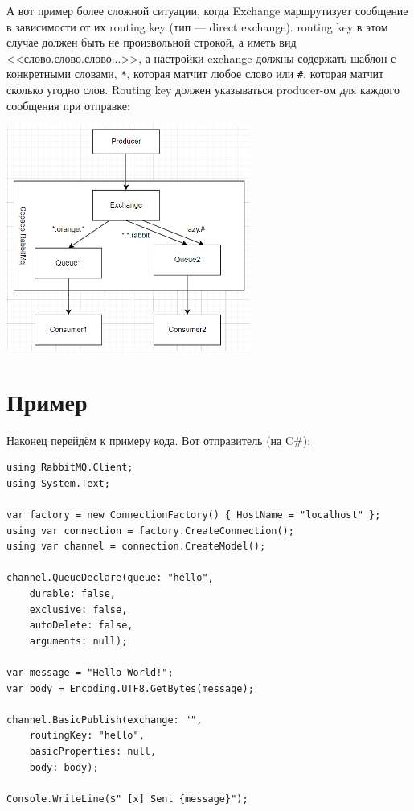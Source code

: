 \documentclass[a5paper]{article}
\begin{document}
А вот пример более сложной ситуации, когда Exchange маршрутизует сообщение в зависимости от их routing key (тип --- direct exchange). routing key в этом случае должен быть не произвольной строкой, а иметь вид <<слово.слово.слово...>>, а настройки exchange должны содержать шаблон с конкретными словами, \verb|*|, которая матчит любое слово или \verb|#|, которая матчит сколько угодно слов. Routing key должен указываться producer-ом для каждого сообщения при отправке:

\begin{center}
    \includegraphics[width=0.6\textwidth]{topicExchange.png}
\end{center}

\section{Пример}

Наконец перейдём к примеру кода. Вот отправитель (на C\#):

\begin{verbatim}
using RabbitMQ.Client;
using System.Text;

var factory = new ConnectionFactory() { HostName = "localhost" };
using var connection = factory.CreateConnection();
using var channel = connection.CreateModel();

channel.QueueDeclare(queue: "hello",
    durable: false,
    exclusive: false,
    autoDelete: false,
    arguments: null);

var message = "Hello World!";
var body = Encoding.UTF8.GetBytes(message);

channel.BasicPublish(exchange: "",
    routingKey: "hello",
    basicProperties: null,
    body: body);

Console.WriteLine($" [x] Sent {message}");
\end{verbatim}
\end{document}

